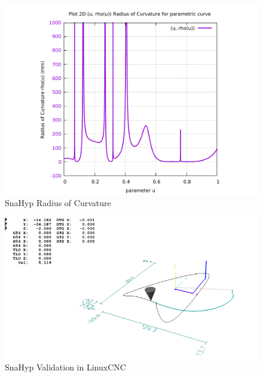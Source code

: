 \begin{figure}
	\caption     {SnaHyp Radius of Curvature}
	\label{02-img-SnaHyp Radius of Curvature.pdf}
\includegraphics[width=1.00\textwidth]{Chap4/appendix/app-SnaHyp/plots/02-img-SnaHyp Radius of Curvature.pdf} 
\end{figure}	


\clearpage
\pagebreak

\begin{figure}
	\caption     {SnaHyp Validation in LinuxCNC}
	\label{03-img-SnaHyp-Validation-in-LinuxCNC.png}
\includegraphics[width=1.00\textwidth]{Chap4/appendix/app-SnaHyp/plots/03-img-SnaHyp-Validation-in-LinuxCNC.png}
\end{figure}


